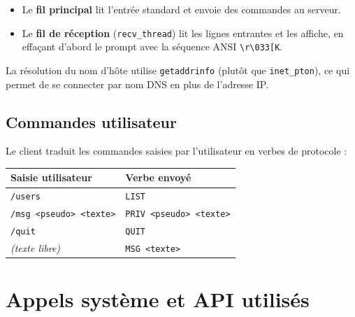 \documentclass[12pt,a4paper]{article}
\begin{document}
\begin{itemize}
    \item Le \textbf{fil principal} lit l'entrée standard et envoie des
          commandes au serveur.
    \item Le \textbf{fil de réception} (\texttt{recv\_thread}) lit les lignes
          entrantes et les affiche, en effaçant d'abord le prompt avec la
          séquence ANSI \texttt{\textbackslash r\textbackslash 033[K}.
\end{itemize}

La résolution du nom d'hôte utilise \texttt{getaddrinfo} (plutôt que
\texttt{inet\_pton}), ce qui permet de se connecter par nom DNS en plus de
l'adresse IP.

\subsection{Commandes utilisateur}

Le client traduit les commandes saisies par l'utilisateur en verbes de
protocole :

\begin{center}
\begin{tabular}{@{}ll@{}}
\toprule
Saisie utilisateur & Verbe envoyé \\
\midrule
\texttt{/users} & \texttt{LIST} \\
\texttt{/msg <pseudo> <texte>} & \texttt{PRIV <pseudo> <texte>} \\
\texttt{/quit} & \texttt{QUIT} \\
\textit{(texte libre)} & \texttt{MSG <texte>} \\
\bottomrule
\end{tabular}
\end{center}

\section{Appels système et API utilisés}
\end{document}
